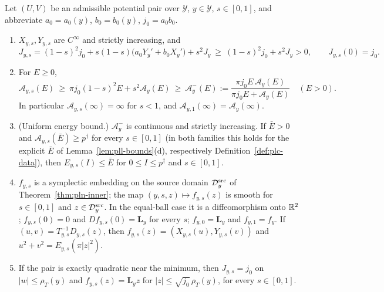 \begin{lemma}\label{lem:pln-energy}
Let $(U,V)$ be an admissible potential pair over $\mathcal Y$, $y\in\mathcal Y$, $s\in[0,1]$, and abbreviate
$a_0=a_0(y)$, $b_0=b_0(y)$, $j_0=a_0b_0$.
\begin{enumerate}[label=(\alph*)]
\item $X_{y,s},Y_{y,s}$ are $C^\infty$ and strictly increasing, and
 \[
  J_{y,s}=(1-s)^2j_0+s(1-s)\bigl(a_0Y_y'+b_0X_y'\bigr)+s^2J_y\ \ge\ (1-s)^2j_0+s^2J_y>0,\qquad J_{y,s}(0)=j_0 .
 \]
\item For $E\ge0$,
 \[
  \mathcal A_{y,s}(E)\ \ge\ \pi j_0(1-s)^2E+s^2\mathcal A_y(E)\ \ge\ \mathcal A^-_y(E):=\frac{\pi j_0E\,\mathcal A_y(E)}{\pi j_0E+\mathcal A_y(E)}\quad(E>0).
 \]
 In particular $\mathcal A_{y,s}(\infty)=\infty$ for $s<1$, and $\mathcal A_{y,1}(\infty)=\mathcal A_y(\infty)$.
\item (Uniform energy bound.) $\mathcal A^-_y$ is continuous and strictly increasing. If $\bar E>0$ and
 $\mathcal A_{y,s}(\bar E)\ge p^\dagger$ for every $s\in[0,1]$ (in both families this holds for the explicit $\bar E$ of
 Lemma~\ref{lem:pll-bounds}(d), respectively Definition~\ref{def:plc-data}), then $E_{y,s}(I)\le\bar E$ for
 $0\le I\le p^\dagger$ and $s\in[0,1]$.
\item $f_{y,s}$ is a symplectic embedding on the source domain $\mathcal D_y^{\rm src}$ of Theorem~\ref{thm:pln-inner}; the map $(y,s,z)\mapsto f_{y,s}(z)$ is smooth for $s\in[0,1]$ and $z\in\mathcal D_y^{\rm src}$. In the equal-ball case it is a diffeomorphism onto $\mathbb{R}^2$; $f_{y,s}(0)=0$ and $Df_{y,s}(0)=\mathbf L_y$ for every $s$;
 $f_{y,0}=\mathbf L_y$ and $f_{y,1}=f_y$. If $(u,v)=T_{y,s}^{-1}D_{y,s}(z)$, then $f_{y,s}(z)=(X_{y,s}(u),Y_{y,s}(v))$ and
 $u^2+v^2=E_{y,s}(\pi|z|^2)$.
\item If the pair is exactly quadratic near the minimum, then $J_{y,s}=j_0$ on $|w|\le\rho_T(y)$ and
 $f_{y,s}(z)=\mathbf L_yz$ for $|z|\le\sqrt{j_0}\,\rho_T(y)$, for every $s\in[0,1]$.
\end{enumerate}
\end{lemma}

